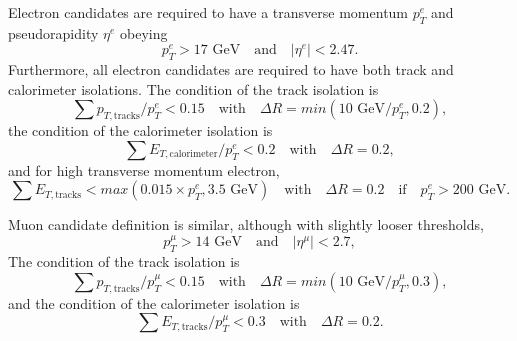 \documentclass{ws-mpla}
\begin{document}
Electron candidates are required to have a transverse momentum $p^e_T$ and pseudorapidity $\eta^e$ obeying
\begin{equation}
p^e_T > 17 \textrm{ GeV}\quad \textrm{and}\quad |\eta^e| < 2.47.
\end{equation}
Furthermore, all electron candidates are required to have both track and calorimeter isolations. The condition of the track isolation is
\begin{equation}
\sum p_{T,\textrm{tracks}}/p^e_T < 0.15\quad \textrm{with}\quad \Delta R=min(10\textrm{ GeV}/p^e_T,0.2),
\end{equation}
the condition of the calorimeter isolation is
\begin{equation}
\sum E_{T,\textrm{calorimeter}}/p^e_T < 0.2\quad \textrm{with}\quad \Delta R=0.2,
\end{equation}
and for high transverse momentum electron, 
\begin{equation}
\sum E_{T,\textrm{tracks}} < max(0.015\times p^e_T,3.5\textrm{ GeV})\quad \textrm{with}\quad \Delta R=0.2\quad \textrm{if}\quad p^e_T > 200\textrm{ GeV}.
\end{equation}

Muon candidate definition is similar, although with slightly looser thresholds,
\begin{equation}
p^{\mu}_T > 14 \textrm{ GeV}\quad \textrm{and}\quad |\eta^{\mu}| < 2.7,
\end{equation}
The condition of the track isolation is 
\begin{equation}
\sum p_{T,\textrm{tracks}}/p^{\mu}_T < 0.15\quad \textrm{with}\quad \Delta R=min(10\textrm{ GeV}/p^{\mu}_T,0.3),
\end{equation}
and the condition of the calorimeter isolation is
\begin{equation}
\sum E_{T,\textrm{tracks}}/p^{\mu}_T < 0.3\quad \textrm{with}\quad \Delta R=0.2.
\end{equation}
\end{document}
